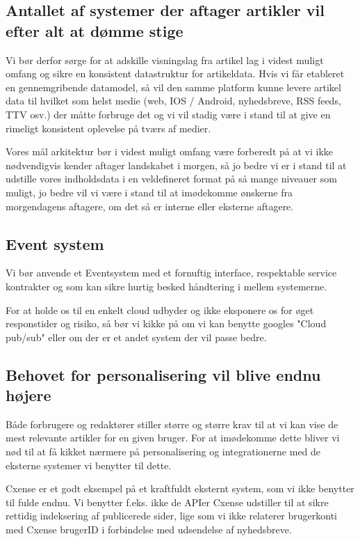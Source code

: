 \documentclass{article}
\begin{document}
\subsection{Antallet af systemer der aftager artikler vil efter alt at dømme stige}
Vi bør derfor sørge for at adskille visningslag fra artikel lag i videst muligt omfang og sikre en konsistent datastruktur for artikeldata. Hvis vi får etableret en gennemgribende datamodel, så vil den samme platform kunne levere artikel data til hvilket som helst medie (web, IOS / Android, nyhedsbreve, RSS feeds, TTV osv.) der måtte forbruge det og vi vil stadig være i stand til at give en rimeligt konsistent oplevelse på tværs af medier.

Vores mål arkitektur bør i videst muligt omfang være forberedt på at vi ikke nødvendigvis kender aftager landskabet i morgen, så jo bedre vi er i stand til at udstille vores indholdsdata i en veldefineret format på så mange niveauer som muligt, jo bedre vil vi være i stand til at imødekomme ønskerne fra morgendagens aftagere, om det så er interne eller eksterne aftagere.


\subsection{Event system}
Vi bør anvende et Eventsystem med et fornuftig interface, respektable service kontrakter og som kan sikre hurtig besked håndtering i mellem systemerne.

For at holde os til en enkelt cloud udbyder og ikke eksponere os for øget responstider og risiko, så bør vi kikke på om vi kan benytte googles "Cloud pub/sub" eller om der er et andet system der vil passe bedre.


\subsection{Behovet for personalisering vil blive endnu højere}
Både forbrugere og redaktører stiller større og større krav til at vi kan vise de mest relevante artikler for en given bruger. For at imødekomme dette bliver vi nød til at få kikket nærmere på personalisering og integrationerne med de eksterne systemer vi benytter til dette.

Cxense er et godt eksempel på et kraftfuldt eksternt system, som vi ikke benytter til fulde endnu. Vi benytter f.eks. ikke de APIer Cxense  udstiller til at sikre rettidig indeksering af publicerede sider, lige som vi ikke relaterer brugerkonti med Cxense brugerID i forbindelse med udsendelse af nyhedsbreve.
\end{document}

